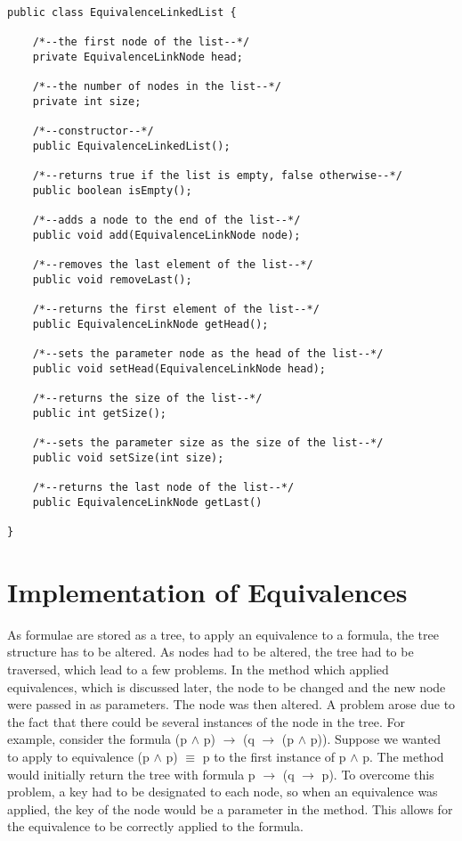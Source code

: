 \documentclass{report}
\begin{document}
\begin{lstlisting}[caption=Methods and fields in the Linked List class, label=find]
public class EquivalenceLinkedList {
	
	/*--the first node of the list--*/
	private EquivalenceLinkNode head;

	/*--the number of nodes in the list--*/
	private int size;

	/*--constructor--*/
	public EquivalenceLinkedList();

	/*--returns true if the list is empty, false otherwise--*/	
	public boolean isEmpty();

	/*--adds a node to the end of the list--*/
	public void add(EquivalenceLinkNode node);
	
	/*--removes the last element of the list--*/
	public void removeLast();

	/*--returns the first element of the list--*/
	public EquivalenceLinkNode getHead();

	/*--sets the parameter node as the head of the list--*/
	public void setHead(EquivalenceLinkNode head);

	/*--returns the size of the list--*/	
	public int getSize();

	/*--sets the parameter size as the size of the list--*/	
	public void setSize(int size);

	/*--returns the last node of the list--*/
	public EquivalenceLinkNode getLast()

}
\end{lstlisting}

\section{Implementation of Equivalences}

As formulae are stored as a tree, to apply an equivalence to a formula, the tree
structure has to be altered. As nodes had to be altered, the tree had to be traversed,
which lead to a few problems. In the method which applied equivalences, which is
discussed later, the node to be changed and the new node were passed in as parameters.
The node was then altered. A problem arose due to the fact that there could be several
instances of the node in the tree. For example, consider the formula (p $\land$ p) $\to$ 
(q $\to$ (p $\land$ p)). Suppose we wanted to apply to equivalence (p $\land$ p) $\equiv$ p to
the first instance of p $\land$ p. The method would initially return the tree with formula 
p $\to$ (q $\to$ p). To overcome this problem, a key had to be designated to each node, so
when an equivalence was applied, the key of the node would be a parameter in the method.
This allows for the equivalence to be correctly applied to the formula.
\end{document}
